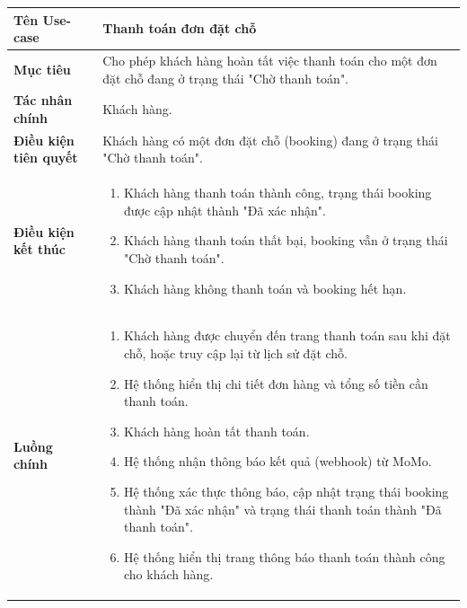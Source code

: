 
\begin{table}[H]
\centering
\renewcommand{\arraystretch}{1.3}
\begin{tabular}{|p{4cm}|p{10cm}|}
\hline
\textbf{Tên Use-case} 
& Thanh toán đơn đặt chỗ \\ 
\hline

\textbf{Mục tiêu} 
& Cho phép khách hàng hoàn tất việc thanh toán cho một đơn đặt chỗ đang ở trạng thái "Chờ thanh toán". \\ 
\hline

\textbf{Tác nhân chính} 
& Khách hàng. \\ 
\hline

\textbf{Điều kiện tiên quyết} 
& Khách hàng có một đơn đặt chỗ (booking) đang ở trạng thái "Chờ thanh toán". \\ 
\hline

\textbf{Điều kiện kết thúc} 
&
\begin{enumerate}
\item Khách hàng thanh toán thành công, trạng thái booking được cập nhật thành "Đã xác nhận".
\item Khách hàng thanh toán thất bại, booking vẫn ở trạng thái "Chờ thanh toán".
\item Khách hàng không thanh toán và booking hết hạn.
\end{enumerate}
\\ 
\hline

\textbf{Luồng chính} 
& 
\begin{enumerate}
    \item Khách hàng được chuyển đến trang thanh toán sau khi đặt chỗ, hoặc truy cập lại từ lịch sử đặt chỗ.
    \item Hệ thống hiển thị chi tiết đơn hàng và tổng số tiền cần thanh toán.
    \item Khách hàng hoàn tất thanh toán.
    \item Hệ thống nhận thông báo kết quả (webhook) từ MoMo.
    \item Hệ thống xác thực thông báo, cập nhật trạng thái booking thành "Đã xác nhận" và trạng thái thanh toán thành "Đã thanh toán".
    \item Hệ thống hiển thị trang thông báo thanh toán thành công cho khách hàng.
\end{enumerate} \\ 
\hline


\end{tabular}
\end{table}
